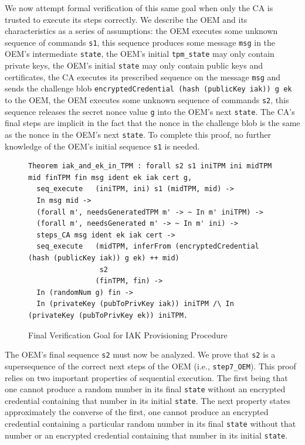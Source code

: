 \documentclass[runningheads]{llncs}
\begin{document}
We now attempt formal verification of this same goal when only the CA
is trusted to execute its steps correctly.  We describe the OEM and its
characteristics as a series of assumptions: the OEM executes some
unknown sequence of commands \verb|s1|, this sequence produces some
message \verb|msg| in the OEM's intermediate \verb|state|, the OEM's
initial \verb|tpm_state| may only contain private keys, the OEM's
initial \verb|state| may only contain public keys and certificates,
the CA executes its prescribed sequence on the message \verb|msg| and
sends the challenge blob
\verb|encryptedCredential (hash (publicKey iak)) g ek| to the OEM, the
OEM executes some unknown sequence of commands \verb|s2|, this
sequence releases the secret nonce value \verb|g| into the OEM's next
\verb|state|. The CA's final steps are implicit in the fact that the
nonce in the challenge blob is the same as the nonce in the OEM's next
\verb|state|.  To complete this proof, no further knowledge of the OEM's initial
sequence \verb|s1| is needed.  

\begin{figure}[hptb]
\begin{lstlisting}[language=Coq]
Theorem iak_and_ek_in_TPM : forall s2 s1 iniTPM ini midTPM mid finTPM fin msg ident ek iak cert g,
  seq_execute   (iniTPM, ini) s1 (midTPM, mid) -> 
  In msg mid ->
  (forall m', needsGeneratedTPM m' -> ~ In m' iniTPM) ->
  (forall m', needsGenerated m' -> ~ In m' ini) ->
  steps_CA msg ident ek iak cert ->
  seq_execute   (midTPM, inferFrom (encryptedCredential (hash (publicKey iak)) g ek) ++ mid) 
                 s2 
                (finTPM, fin) ->
  In (randomNum g) fin ->
  In (privateKey (pubToPrivKey iak)) iniTPM /\ In (privateKey (pubToPrivKey ek)) iniTPM.
\end{lstlisting}
\caption{Final Verification Goal for IAK Provisioning Procedure}
\label{fig:iak_goal}
\end{figure}



The OEM's final sequence \verb|s2| must now be analyzed.  We prove
that \verb|s2| is a supersequence of the correct next steps of the OEM
(i.e., \verb|step7_OEM|). This proof relies on two important
properties of sequential execution. The first being that one cannot
produce a random number in its final \verb|state| without an encrypted
credential containing that number in its initial \verb|state|. The
next property states approximately the converse of the first, one
cannot produce an encrypted credential containing a particular random
number in its final \verb|state| without that number or an encrypted
credential containing that number in its initial \verb|state|.
\end{document}
